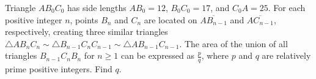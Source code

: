 Triangle $AB_0C_0$ has side lengths $AB_0 = 12$, $B_0C_0 = 17$, and $C_0A = 25$. For each positive integer $n$, points $B_n$ and $C_n$ are located on $\overline{AB_{n-1}}$ and $\overline{AC_{n-1}}$, respectively, creating three similar triangles $\triangle AB_nC_n \sim \triangle B_{n-1}C_nC_{n-1} \sim \triangle AB_{n-1}C_{n-1}$. The area of the union of all triangles $B_{n-1}C_nB_n$ for $n\geq1$ can be expressed as $\tfrac pq$, where $p$ and $q$ are relatively prime positive integers. Find $q$.